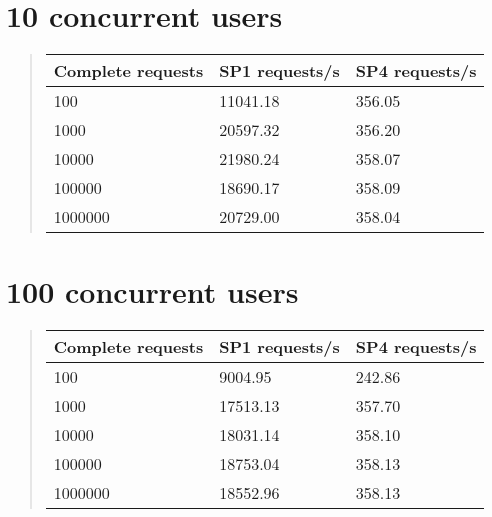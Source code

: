 \documentclass[letterpaper,10pt,english]{sphinxmanual}
\begin{document}
\section{10 concurrent users}
\label{index:concurrent-users}\begin{quote}

\begin{tabulary}{\linewidth}{|L|L|L|}
\hline
\textbf{\relax 
Complete requests
} & \textbf{\relax 
SP1 requests/s
} & \textbf{\relax 
SP4 requests/s
}\\\hline

100
 & 
11041.18
 & 
356.05
\\\hline

1000
 & 
20597.32
 & 
356.20
\\\hline

10000
 & 
21980.24
 & 
358.07
\\\hline

100000
 & 
18690.17
 & 
358.09
\\\hline

1000000
 & 
20729.00
 & 
358.04
\\\hline
\end{tabulary}

\end{quote}


\section{100 concurrent users}
\label{index:id14}\begin{quote}

\begin{tabulary}{\linewidth}{|L|L|L|}
\hline
\textbf{\relax 
Complete requests
} & \textbf{\relax 
SP1 requests/s
} & \textbf{\relax 
SP4 requests/s
}\\\hline

100
 & 
9004.95
 & 
242.86
\\\hline

1000
 & 
17513.13
 & 
357.70
\\\hline

10000
 & 
18031.14
 & 
358.10
\\\hline

100000
 & 
18753.04
 & 
358.13
\\\hline

1000000
 & 
18552.96
 & 
358.13
\\\hline
\end{tabulary}

\end{quote}
\end{document}
